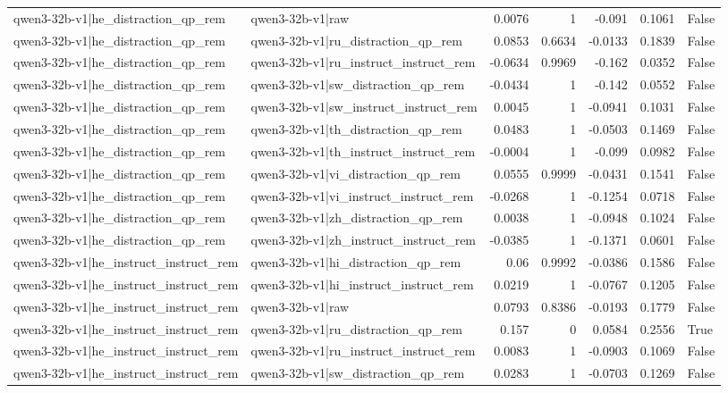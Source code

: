 \begin{table}
\begin{tabular}{l l r r r r l}
qwen3-32b-v1|he_distraction_qp_rem & qwen3-32b-v1|raw & 0.0076 & 1 & -0.091 & 0.1061 & False \\
qwen3-32b-v1|he_distraction_qp_rem & qwen3-32b-v1|ru_distraction_qp_rem & 0.0853 & 0.6634 & -0.0133 & 0.1839 & False \\
qwen3-32b-v1|he_distraction_qp_rem & qwen3-32b-v1|ru_instruct_instruct_rem & -0.0634 & 0.9969 & -0.162 & 0.0352 & False \\
qwen3-32b-v1|he_distraction_qp_rem & qwen3-32b-v1|sw_distraction_qp_rem & -0.0434 & 1 & -0.142 & 0.0552 & False \\
qwen3-32b-v1|he_distraction_qp_rem & qwen3-32b-v1|sw_instruct_instruct_rem & 0.0045 & 1 & -0.0941 & 0.1031 & False \\
qwen3-32b-v1|he_distraction_qp_rem & qwen3-32b-v1|th_distraction_qp_rem & 0.0483 & 1 & -0.0503 & 0.1469 & False \\
qwen3-32b-v1|he_distraction_qp_rem & qwen3-32b-v1|th_instruct_instruct_rem & -0.0004 & 1 & -0.099 & 0.0982 & False \\
qwen3-32b-v1|he_distraction_qp_rem & qwen3-32b-v1|vi_distraction_qp_rem & 0.0555 & 0.9999 & -0.0431 & 0.1541 & False \\
qwen3-32b-v1|he_distraction_qp_rem & qwen3-32b-v1|vi_instruct_instruct_rem & -0.0268 & 1 & -0.1254 & 0.0718 & False \\
qwen3-32b-v1|he_distraction_qp_rem & qwen3-32b-v1|zh_distraction_qp_rem & 0.0038 & 1 & -0.0948 & 0.1024 & False \\
qwen3-32b-v1|he_distraction_qp_rem & qwen3-32b-v1|zh_instruct_instruct_rem & -0.0385 & 1 & -0.1371 & 0.0601 & False \\
qwen3-32b-v1|he_instruct_instruct_rem & qwen3-32b-v1|hi_distraction_qp_rem & 0.06 & 0.9992 & -0.0386 & 0.1586 & False \\
qwen3-32b-v1|he_instruct_instruct_rem & qwen3-32b-v1|hi_instruct_instruct_rem & 0.0219 & 1 & -0.0767 & 0.1205 & False \\
qwen3-32b-v1|he_instruct_instruct_rem & qwen3-32b-v1|raw & 0.0793 & 0.8386 & -0.0193 & 0.1779 & False \\
qwen3-32b-v1|he_instruct_instruct_rem & qwen3-32b-v1|ru_distraction_qp_rem & 0.157 & 0 & 0.0584 & 0.2556 & True \\
qwen3-32b-v1|he_instruct_instruct_rem & qwen3-32b-v1|ru_instruct_instruct_rem & 0.0083 & 1 & -0.0903 & 0.1069 & False \\
qwen3-32b-v1|he_instruct_instruct_rem & qwen3-32b-v1|sw_distraction_qp_rem & 0.0283 & 1 & -0.0703 & 0.1269 & False \\

\end{tabular}
\end{table}
